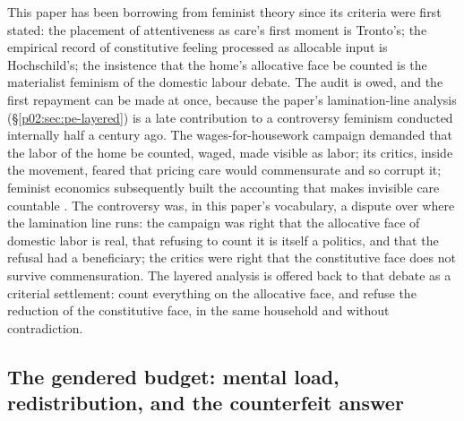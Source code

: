\documentclass[11pt,a4paper]{article}
\begin{document}
This paper has been borrowing from feminist theory since its criteria were first stated: the placement of attentiveness as care's first moment is Tronto's; the empirical record of constitutive feeling processed as allocable input is Hochschild's; the insistence that the home's allocative face be counted is the materialist feminism of the domestic labour debate. The audit is owed, and the first repayment can be made at once, because the paper's lamination-line analysis (\S\ref{p02:sec:pe-layered}) is a late contribution to a controversy feminism conducted internally half a century ago. The wages-for-housework campaign \parencite{federici1975wages} demanded that the labor of the home be counted, waged, made visible as labor; its critics, inside the movement, feared that pricing care would commensurate and so corrupt it; feminist economics subsequently built the accounting that makes invisible care countable \parencite{waring1988if,folbre2001invisible}. The controversy was, in this paper's vocabulary, a dispute over where the lamination line runs: the campaign was right that the allocative face of domestic labor is real, that refusing to count it is itself a politics, and that the refusal had a beneficiary; the critics were right that the constitutive face does not survive commensuration. The layered analysis is offered back to that debate as a criterial settlement: count everything on the allocative face, and refuse the reduction of the constitutive face, in the same household and without contradiction.

\subsection{The gendered budget: mental load, redistribution, and the counterfeit answer}
\label{p02:sec:fem-load}
\end{document}
